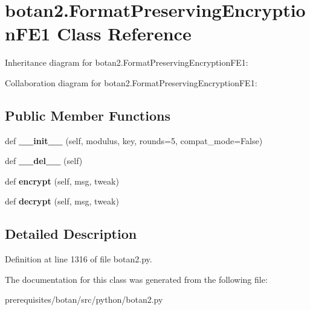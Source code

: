 \hypertarget{classbotan2_1_1_format_preserving_encryption_f_e1}{}\section{botan2.\+Format\+Preserving\+Encryption\+F\+E1 Class Reference}
\label{classbotan2_1_1_format_preserving_encryption_f_e1}


Inheritance diagram for botan2.\+Format\+Preserving\+Encryption\+F\+E1\+:


Collaboration diagram for botan2.\+Format\+Preserving\+Encryption\+F\+E1\+:
\subsection*{Public Member Functions}
\begin{DoxyCompactItemize}
\item 
\mbox{\label{classbotan2_1_1_format_preserving_encryption_f_e1_a33103d8261718961f6e98c9c735d3f72}} 
def {\bfseries \+\_\+\+\_\+init\+\_\+\+\_\+} (self, modulus, key, rounds=5, compat\+\_\+mode=False)
\item 
\mbox{\label{classbotan2_1_1_format_preserving_encryption_f_e1_a4e224c000b294cd5e3af785512b7eaa8}} 
def {\bfseries \+\_\+\+\_\+del\+\_\+\+\_\+} (self)
\item 
\mbox{\label{classbotan2_1_1_format_preserving_encryption_f_e1_a134af6272c75435e35d770df0683c26b}} 
def {\bfseries encrypt} (self, msg, tweak)
\item 
\mbox{\label{classbotan2_1_1_format_preserving_encryption_f_e1_aa57c5d4c29f0d52548ca2f7332a5e7a5}} 
def {\bfseries decrypt} (self, msg, tweak)
\end{DoxyCompactItemize}


\subsection{Detailed Description}


Definition at line 1316 of file botan2.\+py.



The documentation for this class was generated from the following file\+:\begin{DoxyCompactItemize}
\item 
prerequisites/botan/src/python/botan2.\+py\end{DoxyCompactItemize}
